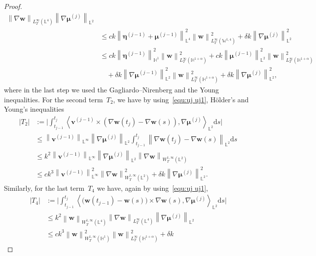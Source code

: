 \documentclass[11pt,reqno]{amsart}
\theoremstyle{definition}
\numberwithin{equation}{section}
\newcommand{\bff}{\boldsymbol}
\newcommand{\bb}{\mathbb}
\newcommand{\ds}{\mathrm{d}s}
\newcommand{\nn}{\nonumber}
\newcommand{\norm}[2]{\left\|{#1}\right\|_{#2}}
\newcommand{\inpro}[2]{\left\langle#1,#2\right\rangle}
\begin{document}
\begin{proof}
\begin{align*}
		\norm{\nabla\bff{w}}{L^\infty_T(\bb{L}^4)}
		\norm{\nabla\bff{\mu}^{(j)}}{\bb{L}^2}
		\\
		&\le
		c k
		\norm{\bff{\eta}^{(j-1)} + \bff{\mu}^{(j-1)}}{\bb{L}^4}^2
		\norm{\bff{w}}{L^\infty_T(\bb{W}^{1,4})}^2
		+
		\delta k
		\norm{\nabla\bff{\mu}^{(j)}}{\bb{L}^2}^2
		\\
		&\leq
		ck \norm{\bff{\eta}^{(j-1)}}{\bb{H}^1}^2  \norm{\bff{w}}{L^\infty_T(\bb{H}^{1+\alpha})}^2
			+
			ck \norm{\bff{\mu}^{(j-1)}}{\bb{L}^2}^2 \norm{\bff{w}}{L^\infty_T(\bb{H}^{1+\alpha})}^2
		\\
		&\quad
		+
			\delta k \norm{\nabla \bff{\mu}^{(j-1)}}{\bb{L}^2}^2 \norm{\bff{w}}{L^\infty_T(\bb{H}^{1+\alpha})}^2
			+
			\delta k \norm{\nabla \bff{\mu}^{(j)}}{\bb{L}^2}^2,
	\end{align*}
	where in the last step we used the Gagliardo--Nirenberg and the Young inequalities.
	For the second term~$T_2$, we have by using~\eqref{equ:uj uj1},
	H\"older's and Young's inequalities
	\begin{align}\label{equ:est T2} 
		|T_2|
		&:=
		\Big|
		\int_{t_{j-1}}^{t_j} 
		\inpro{\bff{v}^{(j-1)} \times (\nabla\bff{w}(t_j) -
			\nabla\bff{w}(s))}{\nabla\bff{\mu}^{(j)}}_{\bb{L}^2} \ds
		\Big|
		\nn\\
		&\le
		\norm{\bff{v}^{(j-1)}}{\bb{L}^\infty}
		\norm{\nabla\bff{\mu}^{(j)}}{\bb{L}^2}
		\int_{t_{j-1}}^{t_j} 
		\norm{\nabla\bff{w}(t_j)-\nabla\bff{w}(s)}{\bb{L}^2} \ds
		\nn\\
		&\le
		k^2  
		\norm{\bff{v}^{(j-1)}}{\bb{L}^\infty}
		\norm{\nabla\bff{\mu}^{(j)}}{\bb{L}^2}
		\norm{\nabla\bff{w}}{W^{1,\infty}_T(\bb{L}^2)} 
		\nn\\
		&\le
		ck^3
			\norm{\bff{v}^{(j-1)}}{\bb{L}^\infty}^2
			\norm{\nabla\bff{w}}{W^{1,\infty}_T(\bb{L}^2)}^2
			+
			\delta k
			\norm{\nabla\bff{\mu}^{(j)}}{\bb{L}^2}^2.
	\end{align}
	Similarly, for the last term~$T_4$ we have, again by using~\eqref{equ:uj uj1},
	\begin{align*} 
		|T_4|
		&:=
		\Big|
		\int_{t_{j-1}}^{t_j} 
		\inpro{
			\big(\bff{w}(t_{j-1})-\bff{w}(s)\big) \times \nabla\bff{w}(s)}
		{\nabla\bff{\mu}^{(j)}}_{\bb{L}^2} \ds
		\Big|
		\\
		&\le
		k^2 \norm{\bff{w}}{W^{1,\infty}_T(\bb{L}^4)} 
		\norm{\nabla\bff{w}}{L^\infty_T(\bb{L}^4)} 
		\norm{\nabla\bff{\mu}^{(j)}}{\bb{L}^2}
		\\
		&\le
		ck^3
			\norm{\bff{w}}{W^{1,\infty}_T(\bb{H}^1)}^2
			\norm{\bff{w}}{L^\infty_T(\bb{H}^{1+\alpha})}^2
			+
			\delta k

\end{align*}
\end{proof}
\end{document}
